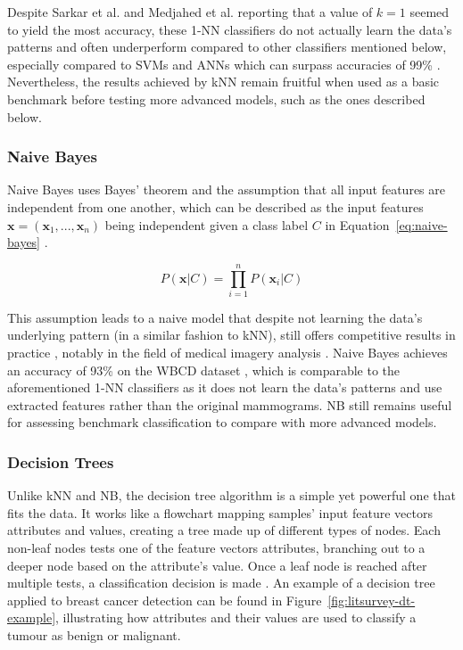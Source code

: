 Despite Sarkar et al. and Medjahed et al. reporting that a value of $k=1$ seemed to yield the most accuracy, these 1-NN classifiers do not actually learn the data's patterns and often underperform compared to other classifiers mentioned below, especially compared to SVMs and ANNs which can surpass accuracies of 99\% \citep{Yue2018, Asri2016, Montazeri2016}. Nevertheless, the results achieved by kNN remain fruitful when used as a basic benchmark before testing more advanced models, such as the ones described below.

\subsubsection{Naive Bayes}

Naive Bayes uses Bayes' theorem and the assumption that all input features are independent from one another, which can be described as the input features $\textbf{x}=(\textbf{x}_1, ..., \textbf{x}_n)$ being independent given a class label $C$ in Equation~\ref{eq:naive-bayes} \citep{rish2001empirical}.

\begin{equation}
\label{eq:naive-bayes}
    P(\textbf{x}|C)=\prod_{i=1}^{n}P(\textbf{x}_i|C)
\end{equation}

This assumption leads to a naive model that despite not learning the data's underlying pattern (in a similar fashion to kNN), still offers competitive results in practice \citep{russell2002artificial}, notably in the field of medical imagery analysis \citep{rish2001empirical}. Naive Bayes achieves an accuracy of 93\% on the WBCD dataset \citep{Kharya2014}, which is comparable to the aforementioned 1-NN classifiers as it does not learn the data's patterns and use extracted features rather than the original mammograms. NB still remains useful for assessing benchmark classification to compare with more advanced models.

\subsubsection{Decision Trees}

Unlike kNN and NB, the decision tree algorithm is a simple yet powerful one that fits the data. It works like a flowchart mapping samples' input feature vectors attributes and values, creating a tree made up of different types of nodes. Each non-leaf nodes tests one of the feature vectors attributes, branching out to a deeper node based on the attribute's value. Once a leaf node is reached after multiple tests, a classification decision is made \citep{quinlan2014c4}. An example of a decision tree applied to breast cancer detection can be found in Figure~\ref{fig:litsurvey-dt-example}, illustrating how attributes and their values are used to classify a tumour as benign or malignant.\\

